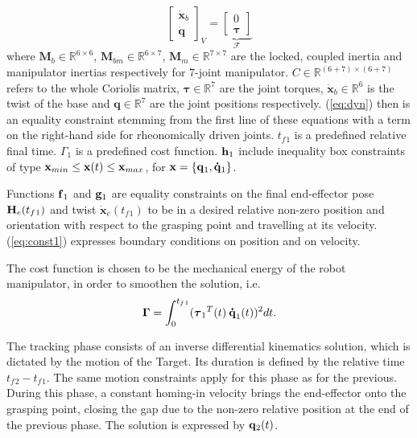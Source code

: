 {\begin{equation}
{\begin{bmatrix}
    \dot{\mathbf{x}}_b\\ \dot{\mathbf{q}} \end{bmatrix}}_{V} = \underbrace{\begin{bmatrix}
    0\\ \mathbf{\tau}
    \end{bmatrix}}_{\mathcal{F}}
\end{equation}
where $    \mathbf{M}_b \in \mathbb{R}^{6\times 6}$, $    \mathbf{M}_{bm} \in \mathbb{R}^{6\times 7}$, $    \mathbf{M}_m \in \mathbb{R}^{7\times 7}$ are the locked, coupled inertia and manipulator inertias respectively for $7$-joint manipulator. $C \in \mathbb{R}^{(6+7)\times(6+7)}$ refers to the whole Coriolis matrix, $\mathbf{\tau} \in \mathbb{R}^7$ are the joint torques, $\dot{\mathbf{x}}_b \in \mathbb{R}^6$ is the twist of the base and $\mathbf{q} \in \mathbb{R}^7$ are the joint positions respectively. (\ref{eq:dyn}) then is an equality constraint stemming from the first line of these equations with a term on the right-hand side for rheonomically driven joints. $t_f{}_1$ is a predefined relative final time. $\Gamma{}_1$ is a predefined cost function. $\boldsymbol {\mathrm{h}}{}_1$ include inequality box constraints of type $\boldsymbol {\mathrm{x}}_{min} \le \boldsymbol {\mathrm{x}}(t) \le \boldsymbol {\mathrm{x}}_{max}$, for $\boldsymbol {\mathrm{x}}=\{\boldsymbol {\mathrm{q}}{}_1, \boldsymbol {\mathrm{\dot{q}}}{}_1 \}$.

Functions $\boldsymbol {\mathrm{f}}{}_1$ and $\boldsymbol {\mathrm{g}}{}_1$ are equality constraints on the final end-effector pose $\boldsymbol {\mathrm{H}}_e(t_f{}_1)$ and twist $\dot{\mathbf{x}}_e(t_f{}_1)$ to be in a desired relative non-zero position and orientation with respect to the grasping point and travelling at its velocity. (\ref{eq:const1}) expresses boundary conditions on position and on velocity. 

The cost function is chosen to be the mechanical energy of the robot manipulator, in order to smoothen the solution, i.e.
\begin{equation}
\boldsymbol {\mathrm{\Gamma}} = \int^{t_f{}_1}_{0} (\boldsymbol {\mathrm{\tau}}_1{}^{T}(t) \: \boldsymbol {\mathrm{\dot{q}}}_1(t)){}^2 dt.
\label{eq:cost}
\end{equation} 

The tracking phase consists of an inverse differential kinematics solution, which is dictated by the motion of the Target. Its duration is defined by the relative time $t_f{}_2 - t_f{}_1$. The same motion constraints apply for this phase as for the previous. During this phase, a constant homing-in velocity brings the end-effector onto the grasping point, closing the gap due to the non-zero relative position at the end of the previous phase. The solution is expressed by $\boldsymbol {\mathrm{q}}{}_2(t)$.
} 

